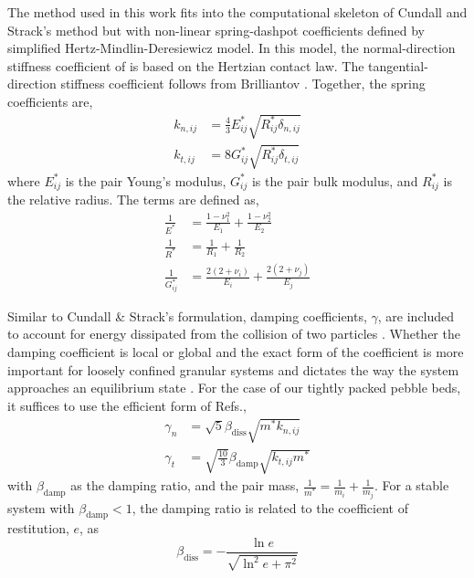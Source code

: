 \documentclass[11pt]{report} %
\begin{document}
The method used in this work fits into the computational skeleton of Cundall and Strack's method but with non-linear spring-dashpot coefficients defined by simplified Hertz-Mindlin-Deresiewicz model. In this model, the normal-direction stiffness coefficient of  is based on the Hertzian contact law. The tangential-direction stiffness coefficient follows from Brilliantov \cite{Brilliantov1996, Zhu2007, Langston1995}. Together, the spring coefficients are,
\begin{subequations}
\begin{align}
	k_{n,ij} &= \frac{4}{3}E_{ij}^*\sqrt{R_{ij}^*\delta_{n,ij}} \\
	k_{t,ij} &= 8 G_{ij}^*\sqrt{R_{ij}^*\delta_{t,ij}}
\end{align}
\end{subequations}
where $E_{ij}^*$ is the pair Young's modulus, $G_{ij}^*$ is the pair bulk modulus, and $R_{ij}^*$ is the relative radius. The terms are defined as,
\begin{subequations}
\begin{align}
	\frac{1}{E^*} &= \frac{1-\nu_1^2}{E_1} + \frac{1-\nu_2^2}{E_2} \\
	\frac{1}{R^*} &= \frac{1}{R_1} + \frac{1}{R_2} \\
	\frac{1}{G^*_{ij}} &= \frac{2(2+\nu_i)}{E_i} + \frac{2(2+\nu_j)}{E_j}
\end{align}
\end{subequations}

Similar to Cundall \& Strack's formulation, damping coefficients, $\gamma$, are included to account for energy dissipated from the collision of two particles \cite{DiRenzo2004, Tsuji1992, Tsuji1993}. Whether the damping coefficient is local or global and the exact form of the coefficient is more important for loosely confined granular systems and dictates the way the system approaches an equilibrium state \cite{Makse2004}. For the case of our tightly packed pebble beds, it suffices to use the efficient form of Refs.\cite{Dippel1996, Makse2004, Brilliantov1996, Zhang2005, Zhu2007},
\begin{subequations}
\begin{align}
	\gamma_n &= \sqrt{5}\beta_\text{diss}\sqrt{m^*k_{n,ij}} \\
	\gamma_t &= \sqrt{\frac{10}{3}}\beta_\text{damp}\sqrt{k_{t,ij} m^*}
\end{align}
\end{subequations}
with $\beta_\text{damp}$ as the damping ratio, and the pair mass, $\frac{1}{m^*} = \frac{1}{m_i} + \frac{1}{m_j}$. For a stable system with $\beta_\text{damp} < 1$, the damping ratio is related to the coefficient of restitution, $e$, as
\begin{equation}
	\beta_\text{diss} = -\frac{\ln{e}}{\sqrt{\ln^2{e}+\pi^2}}
\end{equation}
\end{document}
